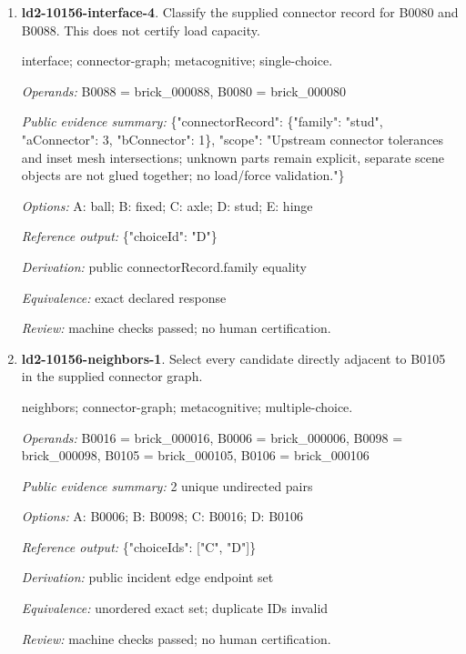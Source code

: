 \begin{enumerate}
\par{\small interface; connector-graph; metacognitive; single-choice.\par\textit{Operands:} B0004 = brick\_000004, B0010 = brick\_000010\par\textit{Public evidence summary:} \{"connectorRecord": \{"family": "hinge", "aConnector": 2, "bConnector": 1\}, "scope": "Upstream connector tolerances and inset mesh intersections; unknown parts remain explicit, separate scene objects are not glued together; no load/force validation."\}\par\textit{Options:} A: stud; B: hinge; C: ball; D: axle; E: fixed\par\textit{Reference output:} \{"choiceId": "B"\}\par\textit{Derivation:} public connectorRecord.family equality\par\textit{Equivalence:} exact declared response\par\textit{Review:} machine checks passed; no human certification.}
\item \textbf{ld2-10156-interface-4}. Classify the supplied connector record for B0080 and B0088. This does not certify load capacity.
\par{\small interface; connector-graph; metacognitive; single-choice.\par\textit{Operands:} B0088 = brick\_000088, B0080 = brick\_000080\par\textit{Public evidence summary:} \{"connectorRecord": \{"family": "stud", "aConnector": 3, "bConnector": 1\}, "scope": "Upstream connector tolerances and inset mesh intersections; unknown parts remain explicit, separate scene objects are not glued together; no load/force validation."\}\par\textit{Options:} A: ball; B: fixed; C: axle; D: stud; E: hinge\par\textit{Reference output:} \{"choiceId": "D"\}\par\textit{Derivation:} public connectorRecord.family equality\par\textit{Equivalence:} exact declared response\par\textit{Review:} machine checks passed; no human certification.}
\item \textbf{ld2-10156-neighbors-1}. Select every candidate directly adjacent to B0105 in the supplied connector graph.
\par{\small neighbors; connector-graph; metacognitive; multiple-choice.\par\textit{Operands:} B0016 = brick\_000016, B0006 = brick\_000006, B0098 = brick\_000098, B0105 = brick\_000105, B0106 = brick\_000106\par\textit{Public evidence summary:} 2 unique undirected pairs\par\textit{Options:} A: B0006; B: B0098; C: B0016; D: B0106\par\textit{Reference output:} \{"choiceIds": ["C", "D"]\}\par\textit{Derivation:} public incident edge endpoint set\par\textit{Equivalence:} unordered exact set; duplicate IDs invalid\par\textit{Review:} machine checks passed; no human certification.}

\end{enumerate}
